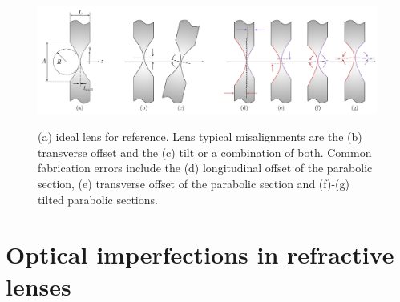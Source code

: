 \begin{refsection}
\begin{figure}[t]
    \centering
    {\includegraphics[width=0.9\linewidth]{figures/ch04/lens_cuts.pdf}}
    \caption[Modelling misalignments and fabrication errors in CRLs]{(a) ideal lens for reference. Lens typical misalignments are the (b) transverse offset and the (c) tilt or a combination of both. Common fabrication errors include the (d) longitudinal offset of the parabolic section, (e) transverse offset of the parabolic section and (f)-(g) tilted parabolic sections.}
    \label{fig:lens_cuts}
\end{figure}

\section{Optical imperfections in refractive lenses}\label{sec:describing_modelling}


\end{refsection}
